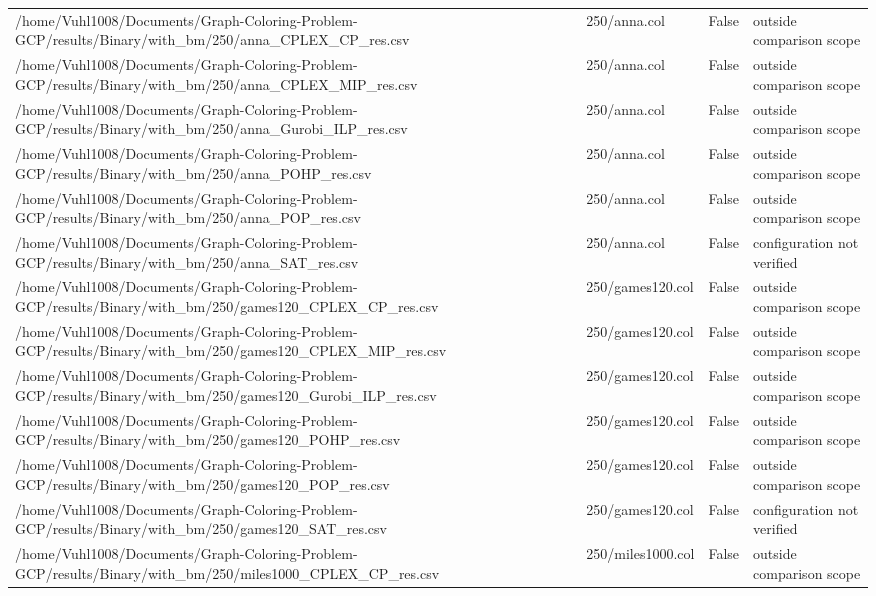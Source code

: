 \begin{table}[htbp]
\begin{tabular}{llll}
/home/Vuhl1008/Documents/Graph-Coloring-Problem-GCP/results/Binary/with\_bm/250/anna\_CPLEX\_CP\_res.csv & 250/anna.col & False & outside comparison scope \\
/home/Vuhl1008/Documents/Graph-Coloring-Problem-GCP/results/Binary/with\_bm/250/anna\_CPLEX\_MIP\_res.csv & 250/anna.col & False & outside comparison scope \\
/home/Vuhl1008/Documents/Graph-Coloring-Problem-GCP/results/Binary/with\_bm/250/anna\_Gurobi\_ILP\_res.csv & 250/anna.col & False & outside comparison scope \\
/home/Vuhl1008/Documents/Graph-Coloring-Problem-GCP/results/Binary/with\_bm/250/anna\_POHP\_res.csv & 250/anna.col & False & outside comparison scope \\
/home/Vuhl1008/Documents/Graph-Coloring-Problem-GCP/results/Binary/with\_bm/250/anna\_POP\_res.csv & 250/anna.col & False & outside comparison scope \\
/home/Vuhl1008/Documents/Graph-Coloring-Problem-GCP/results/Binary/with\_bm/250/anna\_SAT\_res.csv & 250/anna.col & False & configuration not verified \\
/home/Vuhl1008/Documents/Graph-Coloring-Problem-GCP/results/Binary/with\_bm/250/games120\_CPLEX\_CP\_res.csv & 250/games120.col & False & outside comparison scope \\
/home/Vuhl1008/Documents/Graph-Coloring-Problem-GCP/results/Binary/with\_bm/250/games120\_CPLEX\_MIP\_res.csv & 250/games120.col & False & outside comparison scope \\
/home/Vuhl1008/Documents/Graph-Coloring-Problem-GCP/results/Binary/with\_bm/250/games120\_Gurobi\_ILP\_res.csv & 250/games120.col & False & outside comparison scope \\
/home/Vuhl1008/Documents/Graph-Coloring-Problem-GCP/results/Binary/with\_bm/250/games120\_POHP\_res.csv & 250/games120.col & False & outside comparison scope \\
/home/Vuhl1008/Documents/Graph-Coloring-Problem-GCP/results/Binary/with\_bm/250/games120\_POP\_res.csv & 250/games120.col & False & outside comparison scope \\
/home/Vuhl1008/Documents/Graph-Coloring-Problem-GCP/results/Binary/with\_bm/250/games120\_SAT\_res.csv & 250/games120.col & False & configuration not verified \\
/home/Vuhl1008/Documents/Graph-Coloring-Problem-GCP/results/Binary/with\_bm/250/miles1000\_CPLEX\_CP\_res.csv & 250/miles1000.col & False & outside comparison scope \\

\end{tabular}
\end{table}
